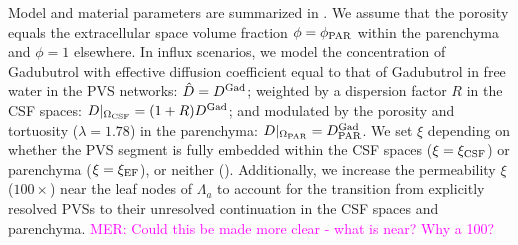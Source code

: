 \documentclass[fleqn,10pt]{wlscirep}
\newcommand{\mer}[1]{\textcolor{magenta}{#1}}
\begin{document}
Model and material parameters are summarized in .
We assume that the porosity equals the extracellular space volume
fraction $\phi = \phi_{\rm PAR}$ within the parenchyma and $\phi = 1$
elsewhere. In influx scenarios, we model the concentration of
Gadubutrol with effective diffusion coefficient equal to that of
Gadubutrol in free water in the PVS networks: $\hat{D} = D^{\rm Gad}$;
weighted by a dispersion factor $R$ in the CSF spaces:
$D|_{\Omega_{\rm CSF}} = ( 1 + R) D^{\rm Gad}$; and modulated by the
porosity and tortuosity ($\lambda = 1.78$) in the parenchyma:
$D|_{\Omega_{\rm PAR}} = D^{\rm Gad}_{\rm PAR}$. We set $\xi$
depending on whether the PVS segment is fully embedded within the CSF
spaces ($\xi = \xi_{\rm CSF}$) or parenchyma ($\xi = \xi_{\rm EF}$),
or neither (). Additionally, we increase the
permeability $\xi$ ($100\times$) near the leaf nodes of $\Lambda_a$ to
account for the transition from explicitly resolved PVSs to their
unresolved continuation in the CSF spaces and parenchyma. \mer{MER:
Could this be made more clear - what is near? Why a 100?}
\end{document}
